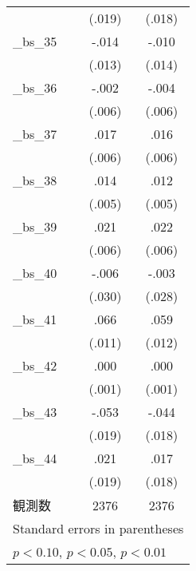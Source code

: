 {\begin{tabular}{l*{2}{c}}
                &       (.019)         &       (.018)         \\
\addlinespace
\_bs\_35          &        -.014         &        -.010         \\
                &       (.013)         &       (.014)         \\
\addlinespace
\_bs\_36          &        -.002         &        -.004         \\
                &       (.006)         &       (.006)         \\
\addlinespace
\_bs\_37          &         .017\sym{***}&         .016\sym{***}\\
                &       (.006)         &       (.006)         \\
\addlinespace
\_bs\_38          &         .014\sym{***}&         .012\sym{**} \\
                &       (.005)         &       (.005)         \\
\addlinespace
\_bs\_39          &         .021\sym{***}&         .022\sym{***}\\
                &       (.006)         &       (.006)         \\
\addlinespace
\_bs\_40          &        -.006         &        -.003         \\
                &       (.030)         &       (.028)         \\
\addlinespace
\_bs\_41          &         .066\sym{***}&         .059\sym{***}\\
                &       (.011)         &       (.012)         \\
\addlinespace
\_bs\_42          &         .000         &         .000         \\
                &       (.001)         &       (.001)         \\
\addlinespace
\_bs\_43          &        -.053\sym{***}&        -.044\sym{**} \\
                &       (.019)         &       (.018)         \\
\addlinespace
\_bs\_44          &         .021         &         .017         \\
                &       (.019)         &       (.018)         \\
\midrule
観測数          &         2376         &         2376         \\
\bottomrule
\multicolumn{3}{l}{\footnotesize Standard errors in parentheses}\\
\multicolumn{3}{l}{\footnotesize \sym{*} \(p<0.10\), \sym{**} \(p<0.05\), \sym{***} \(p<0.01\)}\\
\end{tabular}

}
